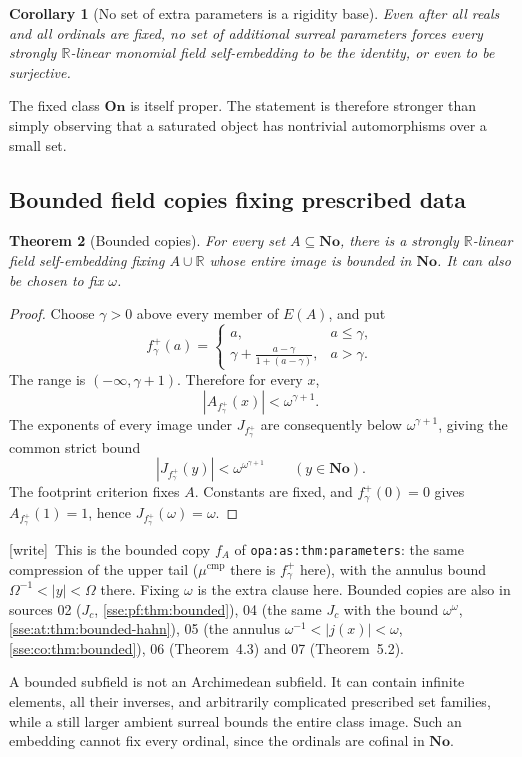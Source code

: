 \documentclass[11pt,a4paper]{article}
\numberwithin{equation}{section}
\theoremstyle{plain}
\newtheorem{theorem}{Theorem}[section]
\newtheorem{corollary}[theorem]{Corollary}
\theoremstyle{definition}
\theoremstyle{remark}
\newcommand{\No}{\mathbf{No}}
\newcommand{\On}{\mathbf{On}}
\newcommand{\R}{\mathbb{R}}
\newcommand{\lbl}[1]{\nolinkurl{#1}}%
\newcommand{\wtag}{\textup{\textsf{[write]}}}%
\newenvironment{wnote}{\par\smallskip\noindent\wtag\ }{\par\smallskip}
\begin{document}
\begin{corollary}[No set of extra parameters is a rigidity base]
Even after all reals and all ordinals are fixed, no set of additional
surreal parameters forces every strongly $\R$-linear monomial field
self-embedding to be the identity, or even to be surjective.
\end{corollary}
The fixed class $\On$ is itself proper. The statement is therefore
stronger than simply observing that a saturated object has nontrivial
automorphisms over a small set.

\subsection{Bounded field copies fixing prescribed data}
\begin{theorem}[Bounded copies]\label{sse:thm:boundedcopy}
For every set $A\subseteq\No$, there is a strongly $\R$-linear field
self-embedding fixing $A\cup\R$ whose entire image is bounded in $\No$.
It can also be chosen to fix $\omega$.
\end{theorem}
\begin{proof}
Choose $\gamma>0$ above every member of $E(A)$, and put
\begin{equation}\label{sse:eq:fupper}
 f^+_\gamma(a)=
 \begin{cases}
 a,&a\le\gamma,\\[1mm]
 \displaystyle\gamma+\frac{a-\gamma}{1+(a-\gamma)},&a>\gamma.
 \end{cases}
\end{equation}
The range is $(-\infty,\gamma+1)$. Therefore for every $x$,
\[
 |A_{f^+_\gamma}(x)|<\omega^{\gamma+1}.
\]
The exponents of every image under $J_{f^+_\gamma}$ are consequently below
$\omega^{\gamma+1}$, giving the common strict bound
\begin{equation}\label{sse:eq:boundedbound}
 |J_{f^+_\gamma}(y)|<\omega^{\omega^{\gamma+1}}
 \qquad(y\in\No).
\end{equation}
The footprint criterion fixes $A$. Constants are fixed, and
$f^+_\gamma(0)=0$ gives $A_{f^+_\gamma}(1)=1$, hence $J_{f^+_\gamma}(\omega)=\omega$.
\end{proof}
\begin{wnote}This is the bounded copy $f_A$ of \lbl{opa:as:thm:parameters}: the same compression of the upper tail ($\mu^{\mathrm{cmp}}$ there is $f^+_\gamma$ here), with the annulus bound $\Omega^{-1}<|y|<\Omega$ there. Fixing $\omega$ is the extra clause here. Bounded copies are also in sources 02 ($J_c$, \cref{sse:pf:thm:bounded}), 04 (the same $J_c$ with the bound $\omega^\omega$, \cref{sse:at:thm:bounded-hahn}), 05 (the annulus $\omega^{-1}<|j(x)|<\omega$, \cref{sse:co:thm:bounded}), 06 (Theorem~4.3) and 07 (Theorem~5.2).\end{wnote}
A bounded subfield is not an Archimedean subfield. It can contain infinite
elements, all their inverses, and arbitrarily complicated prescribed set
families, while a still larger ambient surreal bounds the entire class
image. Such an embedding cannot fix every ordinal, since the ordinals are
cofinal in $\No$.
\end{document}
